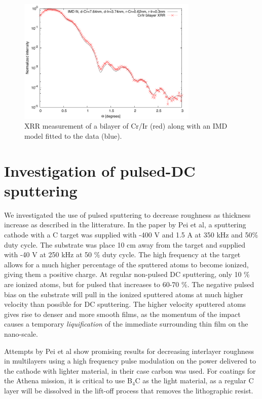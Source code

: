 \begin{figure}[!h]
	\center
	\includegraphics[height=6cm]{figures/athena/coatings/cr-ir-fit.pdf}
\caption{\footnotesize XRR measurement of a bilayer of Cr/Ir (red) along with an IMD model fitted to the data (blue).}\label{fig:cr-ir-fit}
\end{figure}

\section{Investigation of pulsed-DC sputtering}
We investigated the use of pulsed sputtering to decrease roughness as thickness increase as described in the litterature\cite{Pei:2009gn,Shaha:2011gy,Turkin:2010ur}. In the paper by Pei et al, a sputtering cathode with a C target was supplied with -400 V and 1.5 A at 350 kHz and 50\% duty cycle. The substrate was place 10 cm away from the target and supplied with -40 V at 250 kHz at 50 \% duty cycle. The high frequency at the target allows for a much higher percentage of the sputtered atoms to become ionized, giving them a positive charge. At regular non-pulsed DC sputtering, only 10 \% are ionized atoms, but for pulsed that increases to 60-70 \%\cite{Bradley:2002ge,Pei:2008jl}. The negative pulsed bias on the substrate will pull in the ionized sputtered atoms at much higher velocity than possible for DC sputtering. The higher velocity sputtered atoms gives rise to denser and more smooth films, as the momentum of the impact causes a temporary \emph{liquification} of the immediate surrounding thin film on the nano-scale.

Attempts by Pei et al show promising results for decreasing interlayer roughness in multilayers using a high frequency pulse modulation on the power delivered to the cathode with lighter material, in their case carbon was used. For coatings for the Athena mission, it is critical to use B$_4$C as the light material, as a regular C layer will be dissolved in the lift-off process that removes the lithographic resist.


